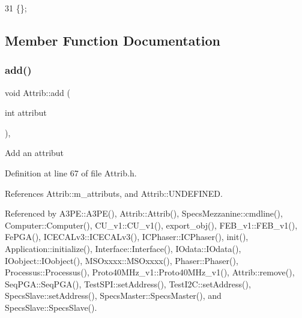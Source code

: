 \begin{DoxyCode}
31 \{\}; 
\end{DoxyCode}


\subsection{Member Function Documentation}
\mbox{\label{classAttrib_a235f773af19c900264a190b00a3b4ad7}} 
\subsubsection{\texorpdfstring{add()}{add()}}
{\footnotesize\ttfamily void Attrib\+::add (\begin{DoxyParamCaption}\item[{int}]{attribut }\end{DoxyParamCaption})\hspace{0.3cm}{\ttfamily [inline]}, {\ttfamily [inherited]}}

Add an attribut 

Definition at line 67 of file Attrib.\+h.



References Attrib\+::m\+\_\+attributs, and Attrib\+::\+U\+N\+D\+E\+F\+I\+N\+ED.



Referenced by A3\+P\+E\+::\+A3\+P\+E(), Attrib\+::\+Attrib(), Specs\+Mezzanine\+::cmdline(), Computer\+::\+Computer(), C\+U\+\_\+v1\+::\+C\+U\+\_\+v1(), export\+\_\+obj(), F\+E\+B\+\_\+v1\+::\+F\+E\+B\+\_\+v1(), Fe\+P\+G\+A(), I\+C\+E\+C\+A\+Lv3\+::\+I\+C\+E\+C\+A\+Lv3(), I\+C\+Phaser\+::\+I\+C\+Phaser(), init(), Application\+::initialize(), Interface\+::\+Interface(), I\+Odata\+::\+I\+Odata(), I\+Oobject\+::\+I\+Oobject(), M\+S\+Oxxxx\+::\+M\+S\+Oxxxx(), Phaser\+::\+Phaser(), Processus\+::\+Processus(), Proto40\+M\+Hz\+\_\+v1\+::\+Proto40\+M\+Hz\+\_\+v1(), Attrib\+::remove(), Seq\+P\+G\+A\+::\+Seq\+P\+G\+A(), Test\+S\+P\+I\+::set\+Address(), Test\+I2\+C\+::set\+Address(), Specs\+Slave\+::set\+Address(), Specs\+Master\+::\+Specs\+Master(), and Specs\+Slave\+::\+Specs\+Slave().


